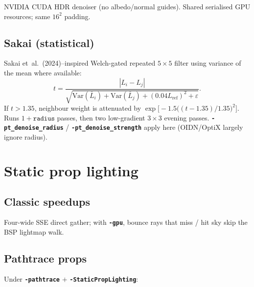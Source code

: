 \documentclass[11pt,a4paper]{article}
\newcommand{\flag}[1]{\texttt{\bfseries #1}}
\begin{document}
NVIDIA CUDA HDR denoiser (no albedo/normal guides). Shared serialised GPU
resources; same $16^{2}$ padding.

\subsection{Sakai (statistical)}

Sakai et~al.\ (2024)--inspired Welch-gated repeated $5\times5$ filter using
variance of the mean where available:
\begin{equation}
  t
  =
  \frac{|L_i-L_j|}
       {\sqrt{\mathrm{Var}(\bar L_i)+\mathrm{Var}(\bar L_j)
              +(0.04 L_{\mathrm{ref}})^{2}+\varepsilon}}.
\end{equation}
If $t>1.35$, neighbour weight is attenuated by
$\exp\!\bigl[-1.5\bigl((t-1.35)/1.35\bigr)^{2}\bigr]$.
Runs $1+\texttt{radius}$ passes, then two low-gradient $3\times3$ evening
passes. \flag{-pt\_denoise\_radius} / \flag{-pt\_denoise\_strength} apply here
(OIDN/OptiX largely ignore radius).

\section{Static prop lighting}
\label{sec:props}

\subsection{Classic speedups}

Four-wide SSE direct gather; with \flag{-gpu}, bounce rays that miss / hit sky
skip the BSP lightmap walk.

\subsection{Pathtrace props}

Under \flag{-pathtrace} $+$ \flag{-StaticPropLighting}:
\end{document}
